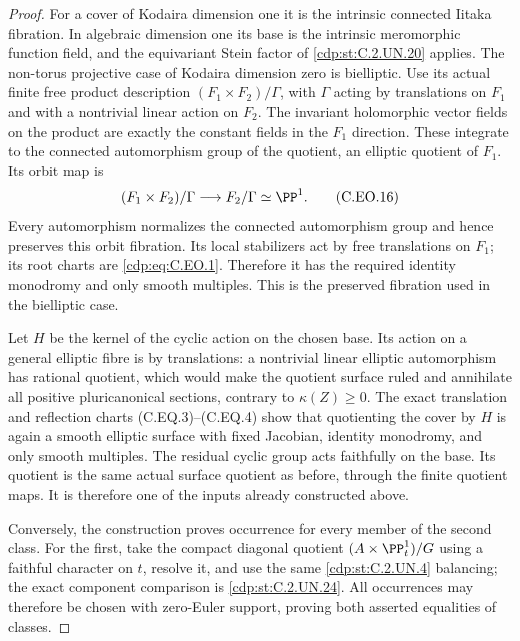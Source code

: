 \begin{proof}
For a cover of Kodaira
dimension one it is the
intrinsic connected Iitaka
fibration. In algebraic
dimension one its base is
the intrinsic meromorphic
function field, and the
equivariant Stein factor
of \ref{cdp:st:C.2.UN.20} applies. The
non-torus projective case
of Kodaira dimension zero
is bielliptic. Use its
actual finite free product
description
$(F_1\times F_2)/\Gamma$,
with $\Gamma$ acting by
translations on $F_1$
and with a nontrivial
linear action on $F_2$.
The invariant holomorphic
vector fields on the
product are exactly the
constant fields in the
$F_1$ direction. These
integrate to the connected
automorphism group of
the quotient, an elliptic
quotient of $F_1$.
Its orbit map is
\[
 (F_1\times F_2)/\Gamma
                   \longrightarrow F_2/\Gamma\simeq\PP^1.
                                                               \tag{C.EO.16}\label{cdp:eq:C.EO.16}
\]
Every automorphism normalizes
the connected automorphism
group and hence preserves
this orbit fibration. Its
local stabilizers act by
free translations on
$F_1$; its root charts
are \eqref{cdp:eq:C.EO.1}. Therefore
it has the required
identity monodromy and
only smooth multiples.
This is the preserved
fibration used in the
bielliptic case.

Let $H$ be the kernel of
the cyclic action on the
chosen base. Its action
on a general elliptic
fibre is by translations:
a nontrivial linear
elliptic automorphism
has rational quotient,
which would make the
quotient surface ruled
and annihilate all
positive pluricanonical
sections, contrary to
$\kappa(Z)\ge0$.
The exact translation
and reflection charts
(C.EQ.3)--(C.EQ.4)
show that quotienting
the cover by $H$ is
again a smooth elliptic
surface with fixed
Jacobian, identity
monodromy, and only
smooth multiples.
The residual cyclic
group acts faithfully
on the base. Its
quotient is the same
actual surface quotient
as before, through
the finite quotient
maps. It is therefore
one of the inputs
already constructed
above.

Conversely, the
construction proves
occurrence for every
member of the second
class. For the first,
take the compact
diagonal quotient
$(A\times\PP^1_t)/G$
using a faithful
character on $t$,
resolve it, and use
the same \ref{cdp:st:C.2.UN.4} balancing;
the exact component
comparison is \ref{cdp:st:C.2.UN.24}.
All occurrences may
therefore be chosen
with zero-Euler
support, proving
both asserted
equalities of classes.
\end{proof}


